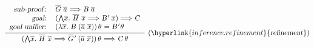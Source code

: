 \begin{isabellebody}
\begin{isamarkuptext}
  \[
  \infer[(\hyperlink{inference.refinement}{\mbox{\isa{refinement}}})]
  {\isa{{\isaliteral{22}{\isachardoublequote}}{\isaliteral{28}{\isacharparenleft}}{\isaliteral{5C3C416E643E}{\isasymAnd}}\isaliteral{5C3C5E7665633E}{}\isactrlvec x{\isaliteral{2E}{\isachardot}}\ \isaliteral{5C3C5E7665633E}{}\isactrlvec H\ \isaliteral{5C3C5E7665633E}{}\isactrlvec x\ {\isaliteral{5C3C4C6F6E6772696768746172726F773E}{\isasymLongrightarrow}}\ \isaliteral{5C3C5E7665633E}{}\isactrlvec G{\isaliteral{27}{\isacharprime}}\ {\isaliteral{28}{\isacharparenleft}}\isaliteral{5C3C5E7665633E}{}\isactrlvec a\ \isaliteral{5C3C5E7665633E}{}\isactrlvec x{\isaliteral{29}{\isacharparenright}}{\isaliteral{29}{\isacharparenright}}{\isaliteral{5C3C76617274686574613E}{\isasymvartheta}}\ {\isaliteral{5C3C4C6F6E6772696768746172726F773E}{\isasymLongrightarrow}}\ C{\isaliteral{5C3C76617274686574613E}{\isasymvartheta}}{\isaliteral{22}{\isachardoublequote}}}}
  {\begin{tabular}{rl}
    \isa{{\isaliteral{22}{\isachardoublequote}}sub{\isaliteral{5C3C68797068656E3E}{\isasymhyphen}}proof{\isaliteral{3A}{\isacharcolon}}{\isaliteral{22}{\isachardoublequote}}} &
    \isa{{\isaliteral{22}{\isachardoublequote}}\isaliteral{5C3C5E7665633E}{}\isactrlvec G\ \isaliteral{5C3C5E7665633E}{}\isactrlvec a\ {\isaliteral{5C3C4C6F6E6772696768746172726F773E}{\isasymLongrightarrow}}\ B\ \isaliteral{5C3C5E7665633E}{}\isactrlvec a{\isaliteral{22}{\isachardoublequote}}} \\
    \isa{{\isaliteral{22}{\isachardoublequote}}goal{\isaliteral{3A}{\isacharcolon}}{\isaliteral{22}{\isachardoublequote}}} &
    \isa{{\isaliteral{22}{\isachardoublequote}}{\isaliteral{28}{\isacharparenleft}}{\isaliteral{5C3C416E643E}{\isasymAnd}}\isaliteral{5C3C5E7665633E}{}\isactrlvec x{\isaliteral{2E}{\isachardot}}\ \isaliteral{5C3C5E7665633E}{}\isactrlvec H\ \isaliteral{5C3C5E7665633E}{}\isactrlvec x\ {\isaliteral{5C3C4C6F6E6772696768746172726F773E}{\isasymLongrightarrow}}\ B{\isaliteral{27}{\isacharprime}}\ \isaliteral{5C3C5E7665633E}{}\isactrlvec x{\isaliteral{29}{\isacharparenright}}\ {\isaliteral{5C3C4C6F6E6772696768746172726F773E}{\isasymLongrightarrow}}\ C{\isaliteral{22}{\isachardoublequote}}} \\
    \isa{{\isaliteral{22}{\isachardoublequote}}goal\ unifier{\isaliteral{3A}{\isacharcolon}}{\isaliteral{22}{\isachardoublequote}}} &
    \isa{{\isaliteral{22}{\isachardoublequote}}{\isaliteral{28}{\isacharparenleft}}{\isaliteral{5C3C6C616D6264613E}{\isasymlambda}}\isaliteral{5C3C5E7665633E}{}\isactrlvec x{\isaliteral{2E}{\isachardot}}\ B\ {\isaliteral{28}{\isacharparenleft}}\isaliteral{5C3C5E7665633E}{}\isactrlvec a\ \isaliteral{5C3C5E7665633E}{}\isactrlvec x{\isaliteral{29}{\isacharparenright}}{\isaliteral{29}{\isacharparenright}}{\isaliteral{5C3C76617274686574613E}{\isasymvartheta}}\ {\isaliteral{3D}{\isacharequal}}\ B{\isaliteral{27}{\isacharprime}}{\isaliteral{5C3C76617274686574613E}{\isasymvartheta}}{\isaliteral{22}{\isachardoublequote}}} \\

\end{tabular}}\]
\end{isamarkuptext}
\end{isabellebody}
